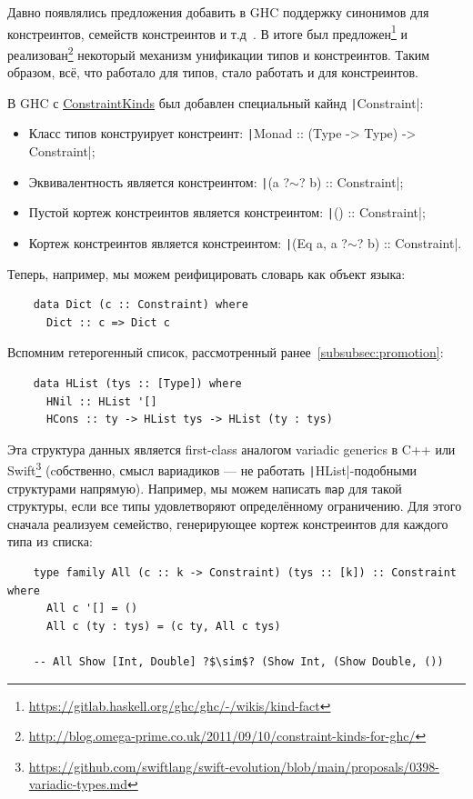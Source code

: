 
Давно появлялись предложения добавить в GHC поддержку синонимов для констреинтов, семейств констреинтов и т.д~\cite{orchard2010haskell}.
В итоге был предложен\footnote{\url{https://gitlab.haskell.org/ghc/ghc/-/wikis/kind-fact}} и реализован\footnote{\url{http://blog.omega-prime.co.uk/2011/09/10/constraint-kinds-for-ghc/}} некоторый механизм унификации типов и констреинтов.
Таким образом, всё, что работало для типов, стало работать и для констреинтов.

В GHC с \href{https://downloads.haskell.org/ghc/9.2-latest/docs/html/users_guide/exts/constraint_kind.html}{ConstraintKinds} был добавлен специальный кайнд \texttt|Constraint|:
\begin{itemize}
    \item Класс типов конструирует констреинт: \texttt|Monad :: (Type -> Type) -> Constraint|;
    \item Эквивалентность является констреинтом: \texttt|(a ?$\sim$? b) :: Constraint|;
    \item Пустой кортеж констреинтов является констреинтом: \texttt|() :: Constraint|;
    \item Кортеж констреинтов является констреинтом: \texttt|(Eq a, a ?$\sim$? b) :: Constraint|.
\end{itemize}

Теперь, например, мы можем реифицировать словарь как объект языка:
\begin{verbatim}
    data Dict (c :: Constraint) where
      Dict :: c => Dict c
\end{verbatim}

Вспомним гетерогенный список, рассмотренный ранее~\ref{subsubsec:promotion}:
\begin{verbatim}
    data HList (tys :: [Type]) where
      HNil :: HList '[]
      HCons :: ty -> HList tys -> HList (ty : tys)
\end{verbatim}

Эта структура данных является first-class аналогом variadic generics в C++ или Swift\footnote{\url{https://github.com/swiftlang/swift-evolution/blob/main/proposals/0398-variadic-types.md}} (cобственно, смысл вариадиков --- не работать \texttt|HList|-подобными структурами напрямую).
Например, мы можем написать \texttt{map} для такой структуры, если все типы удовлетворяют определённому ограничению.
Для этого сначала реализуем семейство, генерирующее кортеж констреинтов для каждого типа из списка:
\begin{verbatim}
    type family All (c :: k -> Constraint) (tys :: [k]) :: Constraint where
      All c '[] = ()
      All c (ty : tys) = (c ty, All c tys)

    -- All Show [Int, Double] ?$\sim$? (Show Int, (Show Double, ())
\end{verbatim}

